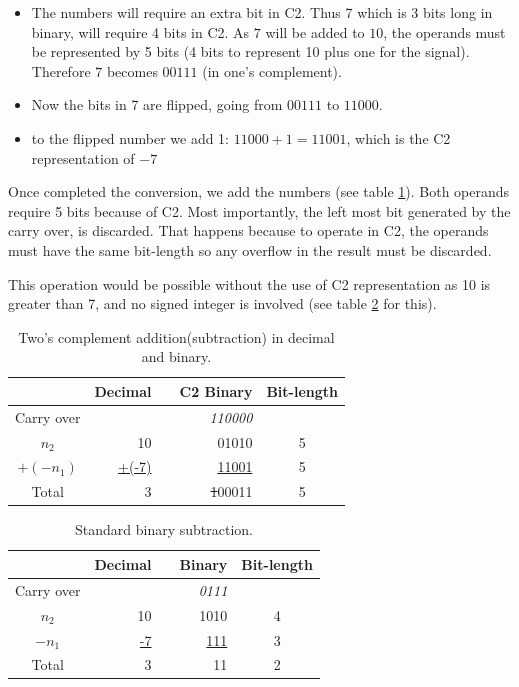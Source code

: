 \documentclass[10pt]{article}
\begin{document}
\begin{itemize}
    \item The numbers will require an extra bit in C2. Thus 7 which is 3
bits long in binary, will require 4 bits in C2. As $7$ will be added to $10$,
the operands must be represented by 5 bits (4 bits to represent 10 plus one for
the signal). Therefore $7$ becomes $00111$ (in one's complement).

    \item Now the bits in 7 are flipped, going from $00111$ to $11000$.

    \item to the flipped number we add 1: $11000+1=11001$, which is the C2
representation of $-7$
\end{itemize}

Once completed the conversion, we add the numbers (see table  \ref{tab:03}).
Both operands require 5 bits because of C2. Most importantly, the left most
bit generated by the carry over, is discarded. That happens because to operate
in C2, the operands must have the same bit-length so any overflow in the result
must be discarded.

This operation would be possible without the use of C2 representation as 10 is
greater than 7, and no signed integer is involved (see table \ref{tab:04} for
this).

\begin{table}[ht]
	\centering
    \caption{Two's complement addition(subtraction) in decimal and binary.}
    \begin{tabular}{crrrc}
    \hline
    	  & Decimal & & C2 Binary & Bit-length \\
    \hline      
    Carry over & 	& & \textit{110000} & \\
    $n_2$ & 10	& & 01010 & 5 \\
    $+(-n_1)$ & \underline{+(-7)} & & \underline{11001} & 5 \\
    Total & 3	& & \sout{1}00011 & 5 \\
    \hline
	\end{tabular}
    \label{tab:03}
\end{table}

\begin{table}[ht]
    \centering
    \caption{Standard binary subtraction.}
    \begin{tabular}{crrrc}
    \hline
    	  & Decimal & & Binary & Bit-length \\
    \hline      
    Carry over& 	& & \textit{0111} & \\
    $n_2$ & 10	& & 1010 & 4 \\
    $-n_1$ & \underline{-7} & & \underline{111} & 3 \\
    Total & 3	& & 11 & 2\\
    \hline
	\end{tabular}
    \label{tab:04}
\end{table}
\end{document}
